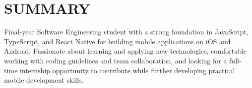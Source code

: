 \section{SUMMARY}
\small
\noindent Final-year Software Engineering student with a strong foundation in JavaScript, TypeScript, and React Native for building mobile applications on iOS and Android. Passionate about learning and applying new technologies, comfortable working with coding guidelines and team collaboration, and looking for a full-time internship opportunity to contribute while further developing practical mobile development skills.

\normalsize